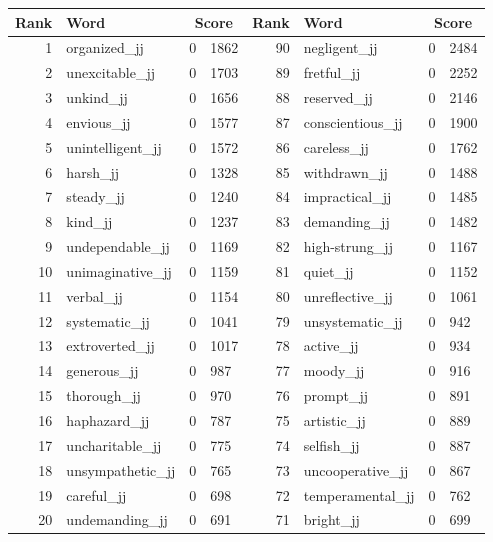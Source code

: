 \begin{table}[tbp]
    \begin{tabular}{| rlr@{.}l | rlr@{.}l |}
    \hline
    \textbf{Rank} & \textbf{Word} & \multicolumn{2}{c|}{\textbf{Score}} & \textbf{Rank} & \textbf{Word} & \multicolumn{2}{c|}{\textbf{Score}} \\
    \hline
    1 & organized\_jj & 0 & 1862    &    90 & negligent\_jj & 0 & 2484 \\
    2 & unexcitable\_jj & 0 & 1703    &    89 & fretful\_jj & 0 & 2252 \\
    3 & unkind\_jj & 0 & 1656    &    88 & reserved\_jj & 0 & 2146 \\
    4 & envious\_jj & 0 & 1577    &    87 & conscientious\_jj & 0 & 1900 \\
    5 & unintelligent\_jj & 0 & 1572    &    86 & careless\_jj & 0 & 1762 \\
    6 & harsh\_jj & 0 & 1328    &    85 & withdrawn\_jj & 0 & 1488 \\
    7 & steady\_jj & 0 & 1240    &    84 & impractical\_jj & 0 & 1485 \\
    8 & kind\_jj & 0 & 1237    &    83 & demanding\_jj & 0 & 1482 \\
    9 & undependable\_jj & 0 & 1169    &    82 & high-strung\_jj & 0 & 1167 \\
    10 & unimaginative\_jj & 0 & 1159    &    81 & quiet\_jj & 0 & 1152 \\
    11 & verbal\_jj & 0 & 1154    &    80 & unreflective\_jj & 0 & 1061 \\
    12 & systematic\_jj & 0 & 1041    &    79 & unsystematic\_jj & 0 & 942 \\
    13 & extroverted\_jj & 0 & 1017    &    78 & active\_jj & 0 & 934 \\
    14 & generous\_jj & 0 & 987    &    77 & moody\_jj & 0 & 916 \\
    15 & thorough\_jj & 0 & 970    &    76 & prompt\_jj & 0 & 891 \\
    16 & haphazard\_jj & 0 & 787    &    75 & artistic\_jj & 0 & 889 \\
    17 & uncharitable\_jj & 0 & 775    &    74 & selfish\_jj & 0 & 887 \\
    18 & unsympathetic\_jj & 0 & 765    &    73 & uncooperative\_jj & 0 & 867 \\
    19 & careful\_jj & 0 & 698    &    72 & temperamental\_jj & 0 & 762 \\
    20 & undemanding\_jj & 0 & 691    &    71 & bright\_jj & 0 & 699 \\

\end{tabular}
\end{table}
